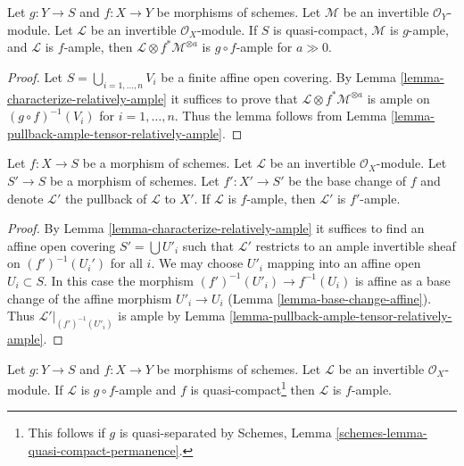 \begin{lemma}
\label{lemma-ample-composition}
Let $g : Y \to S$ and $f : X \to Y$ be morphisms of schemes.
Let $\mathcal{M}$ be an invertible $\mathcal{O}_Y$-module.
Let $\mathcal{L}$ be an invertible $\mathcal{O}_X$-module.
If $S$ is quasi-compact, $\mathcal{M}$ is $g$-ample, and
$\mathcal{L}$ is $f$-ample, then
$\mathcal{L} \otimes f^*\mathcal{M}^{\otimes a}$
is $g \circ f$-ample for $a \gg 0$.
\end{lemma}

\begin{proof}
Let $S = \bigcup_{i = 1, \ldots, n} V_i$ be a finite affine open covering.
By Lemma \ref{lemma-characterize-relatively-ample}
it suffices to prove that 
$\mathcal{L} \otimes f^*\mathcal{M}^{\otimes a}$
is ample on $(g \circ f)^{-1}(V_i)$ for $i = 1, \ldots, n$.
Thus the lemma follows from
Lemma \ref{lemma-pullback-ample-tensor-relatively-ample}.
\end{proof}

\begin{lemma}
\label{lemma-ample-base-change}
Let $f : X \to S$ be a morphism of schemes.
Let $\mathcal{L}$ be an invertible $\mathcal{O}_X$-module.
Let $S' \to S$ be a morphism of schemes.
Let $f' : X' \to S'$ be the base change of $f$ and denote
$\mathcal{L}'$ the pullback of $\mathcal{L}$ to $X'$.
If $\mathcal{L}$ is $f$-ample, then $\mathcal{L}'$ is $f'$-ample.
\end{lemma}

\begin{proof}
By Lemma \ref{lemma-characterize-relatively-ample} it suffices
to find an affine open covering $S' = \bigcup U'_i$
such that $\mathcal{L}'$ restricts to an ample invertible
sheaf on $(f')^{-1}(U_i')$ for all $i$. We may choose $U'_i$
mapping into an affine open $U_i \subset S$. In this case the
morphism $(f')^{-1}(U'_i) \to f^{-1}(U_i)$ is affine as a base
change of the affine morphism $U'_i \to U_i$
(Lemma \ref{lemma-base-change-affine}). Thus
$\mathcal{L}'|_{(f')^{-1}(U'_i)}$ is ample by
Lemma \ref{lemma-pullback-ample-tensor-relatively-ample}.
\end{proof}

\begin{lemma}
\label{lemma-ample-permanence}
Let $g : Y \to S$ and $f : X \to Y$ be morphisms of schemes.
Let $\mathcal{L}$ be an invertible $\mathcal{O}_X$-module.
If $\mathcal{L}$ is $g \circ f$-ample and $f$ is
quasi-compact\footnote{This follows if $g$ is quasi-separated by
Schemes, Lemma \ref{schemes-lemma-quasi-compact-permanence}.}
then $\mathcal{L}$ is $f$-ample.
\end{lemma}

